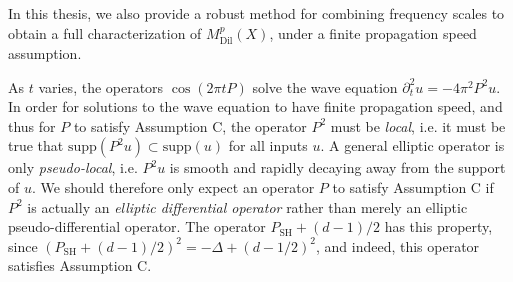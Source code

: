 In this thesis, we also provide a robust method for combining frequency scales to obtain a full characterization of $M^p_{\text{Dil}}(X)$, under a finite propagation speed assumption.

\vspace{0.5em}

\noindent {}

\vspace{0.4em}

As $t$ varies, the operators $\cos(2 \pi t P)$ solve the wave equation $\partial_t^2 u = - 4 \pi^2 P^2 u$. In order for solutions to the wave equation to have finite propagation speed, and thus for $P$ to satisfy Assumption C, the operator $P^2$ must be \emph{local}, i.e. it must be true that $\text{supp}(P^2u) \subset \text{supp}(u)$ for all inputs $u$. A general elliptic operator is only \emph{pseudo-local}, i.e. $P^2u$ is smooth and rapidly decaying away from the support of $u$. We should therefore only expect an operator $P$ to satisfy Assumption C if $P^2$ is actually an \emph{elliptic differential operator} rather than merely an elliptic pseudo-differential operator. The operator $P_{\text{SH}} + (d-1)/2$ has this property, since $(P_{\text{SH}} + (d-1)/2)^2 = -\Delta + (d-1/2)^2$, and indeed, this operator satisfies Assumption C.

